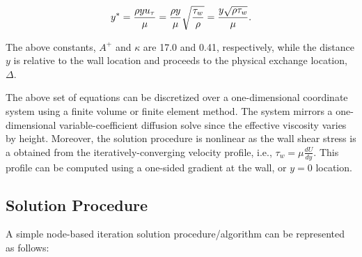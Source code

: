 \documentclass{article}
\begin{document}
\begin{align} 
       y^* =  {{ \rho y u_{\tau}} \over {\mu }} =  {{ \rho y } \over {\mu}}\sqrt{\frac{\tau_w}{\rho}} 
       =  \frac{y \sqrt{\rho \tau_w}}{\mu}.
\label{odeExpressionYStar}
\end{align}

The above constants, $A^+$ and $\kappa$ are 17.0 and 0.41, respectively, while the distance $y$ is relative
to the wall location and proceeds to the physical exchange location, $\Delta$.

The above set of equations can be discretized over a one-dimensional coordinate system using a finite volume or 
finite element method. The system mirrors a one-dimensional variable-coefficient diffusion solve since 
the effective viscosity varies by height. Moreover, the solution procedure is nonlinear as the wall shear 
stress is a obtained from the iteratively-converging velocity profile, i.e., $\tau_w = \mu \frac{dU}{dy}$. 
This profile can be computed using a one-sided gradient at the wall, or $y=0$ location. 

\subsection{Solution Procedure}
A simple node-based iteration solution procedure/algorithm can be represented as follows:
\end{document}
